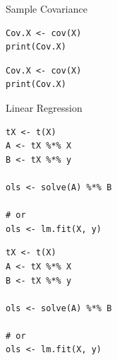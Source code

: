 \begin{frame}[fragile]
  \begin{exampleblock}{Sample Covariance}\pause
\begin{lstlisting}[title=Serial Code]
Cov.X <- cov(X)
print(Cov.X)
\end{lstlisting}

\begin{lstlisting}[title=Parallel Code]
Cov.X <- cov(X)
print(Cov.X)
\end{lstlisting}
  \end{exampleblock}
\end{frame}

\begin{frame}
  \begin{exampleblock}{Linear Regression}\pause
\begin{lstlisting}[title=Serial Code]
tX <- t(X)
A <- tX %*% X
B <- tX %*% y

ols <- solve(A) %*% B

# or
ols <- lm.fit(X, y)
\end{lstlisting}
  
\begin{lstlisting}[title=Parallel Code]
tX <- t(X)
A <- tX %*% X
B <- tX %*% y

ols <- solve(A) %*% B

# or
ols <- lm.fit(X, y)
\end{lstlisting}
  \end{exampleblock}
\end{frame}



